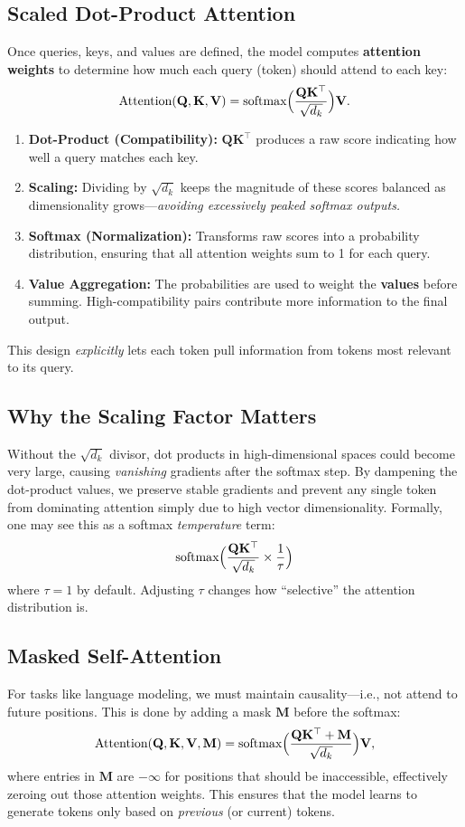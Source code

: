 \subsection{Scaled Dot-Product Attention}
\noindent
Once queries, keys, and values are defined, the model computes \textbf{attention weights} to determine how much each query (token) should attend to each key:
\[
\text{Attention}(\mathbf{Q}, \mathbf{K}, \mathbf{V}) 
= \text{softmax}\Bigl(\frac{\mathbf{Q} \mathbf{K}^\top}{\sqrt{d_k}}\Bigr) \mathbf{V}.
\]
\begin{enumerate}
    \item \textbf{Dot-Product (Compatibility):} 
    $\mathbf{Q}\mathbf{K}^\top$ produces a raw score indicating how well a query matches each key.
    \item \textbf{Scaling:} 
    Dividing by $\sqrt{d_k}$ keeps the magnitude of these scores balanced as dimensionality grows—\emph{avoiding excessively peaked softmax outputs.}
    \item \textbf{Softmax (Normalization):} 
    Transforms raw scores into a probability distribution, ensuring that all attention weights sum to 1 for each query.
    \item \textbf{Value Aggregation:} 
    The probabilities are used to weight the \textbf{values} before summing. High-compatibility pairs contribute more information to the final output.
\end{enumerate}
This design \emph{explicitly} lets each token pull information from tokens most relevant to its query.

\subsection{Why the Scaling Factor Matters}
\noindent
Without the $\sqrt{d_k}$ divisor, dot products in high-dimensional spaces could become very large, causing \emph{vanishing} gradients after the softmax step. By dampening the dot-product values, we preserve stable gradients and prevent any single token from dominating attention simply due to high vector dimensionality. Formally, one may see this as a softmax \emph{temperature} term:
\[
\text{softmax}\Bigl(\frac{\mathbf{Q}\mathbf{K}^\top}{\sqrt{d_k}} \times \frac{1}{\tau}\Bigr)
\]
where $\tau = 1$ by default. Adjusting $\tau$ changes how “selective” the attention distribution is.

\subsection{Masked Self-Attention}
\noindent
For tasks like language modeling, we must maintain causality—i.e., not attend to future positions. This is done by adding a mask $\mathbf{M}$ before the softmax:
\[
\text{Attention}(\mathbf{Q}, \mathbf{K}, \mathbf{V}, \mathbf{M}) 
= \text{softmax}\Bigl(\frac{\mathbf{Q} \mathbf{K}^\top + \mathbf{M}}{\sqrt{d_k}}\Bigr) \mathbf{V},
\]
where entries in $\mathbf{M}$ are $-\infty$ for positions that should be inaccessible, effectively zeroing out those attention weights. This ensures that the model learns to generate tokens only based on \emph{previous} (or current) tokens.

